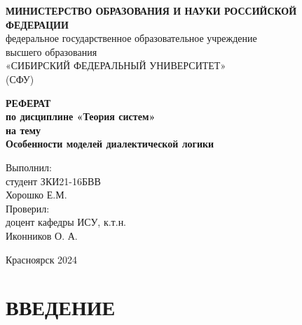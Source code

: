 \documentclass[a4paper,12pt]{report}
\author{}
\renewcommand{\contentsname}{Содержание}
\begin{document}
	
	\title{}
\pagestyle{empty}
	\begin{center}
	 \textbf{МИНИСТЕРСТВО ОБРАЗОВАНИЯ И НАУКИ РОССИЙСКОЙ ФЕДЕРАЦИИ}\\
 федеральное государственное образовательное учреждение\\ высшего образования\\
«СИБИРСКИЙ ФЕДЕРАЛЬНЫЙ УНИВЕРСИТЕТ»\\
(СФУ)\\
\vspace{0.2em}




\end{center}

\vspace{6em}
\begin{center}
	 \bfseries{ РЕФЕРАТ } \\%
	\vspace{1em} по дисциплине «Теория систем»\\
\vspace{0.5em} на тему \\
\vspace{0.5em} 
\large{Особенности моделей диалектической логики}\\
\end{center}
\vspace{0.5em}
\textsl{}
\vspace{6em}




\begin{flushright}
Выполнил:\\
студент ЗКИ21-16БВВ \\
Хорошко Е.М.\\
\vspace{1.5em}
Проверил:\\
доцент кафедры ИСУ, к.т.н.\\
Иконников О. А.\\
\end{flushright} 
\begin{center}
	\vspace{8em}
	Красноярск 2024
\end{center}

\newpage

\pagestyle{empty} 
\def\contentsname{Содержание}
\tableofcontents

\newpage

\chapter*{ВВЕДЕНИЕ}
 \\
\pagestyle{plain} \\
\end{document}
